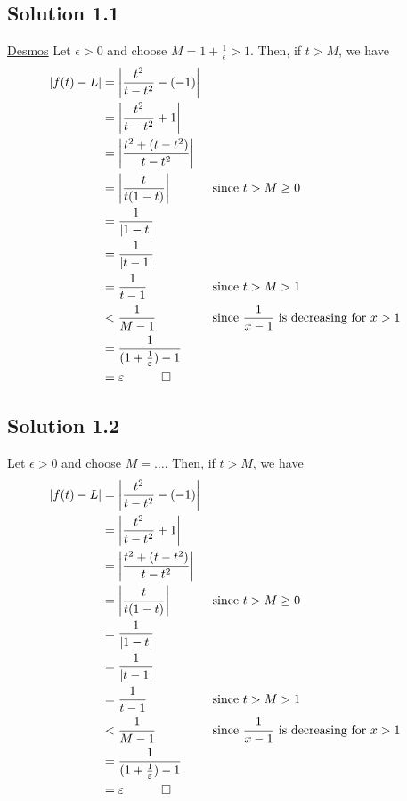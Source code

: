 \documentclass{article}
\begin{document}
\subsection*{Solution 1.1}
\href{https://www.desmos.com/calculator/xb5irgigpt}{Desmos}
Let $\epsilon > 0$ and choose $M = 1+\frac{1}{\epsilon} > 1$. Then, if $t > M$, we have
\begin{align*}
    \left| f(t) - L \right|     
    &= \left| \frac{t^2}{t-t^2} - (-1) \right| \\
    &= \left| \frac{t^2}{t-t^2} + 1 \right| \\
    &= \left| \frac{t^2+(t-t^2)}{t-t^2} \right| \\
    &= \left| \frac{t}{t(1-t)} \right| && \text{since }t > M \geq 0 \\
    &= \frac{1}{\left|1-t\right|} \\
    &= \frac{1}{\left|t-1\right|} \\
    &= \frac{1}{t-1} && \text{since } t >M > 1 \\
    &< \frac{1}{M-1} && \text{since } \frac{1}{x-1} \text{ is decreasing for } x > 1 \\
    &= \frac{1}{(1+\frac{1}{\epsilon})-1} \\
    &= \epsilon \quad \qed
\end{align*}
\subsection*{Solution 1.2}
Let $\epsilon > 0$ and choose $M = \ldots$. Then, if $t > M$, we have
\begin{align*}
    \left| f(t) - L \right|     
    &= \left| \frac{t^2}{t-t^2} - (-1) \right| \\
    &= \left| \frac{t^2}{t-t^2} + 1 \right| \\
    &= \left| \frac{t^2+(t-t^2)}{t-t^2} \right| \\
    &= \left| \frac{t}{t(1-t)} \right| && \text{since }t > M \geq 0 \\
    &= \frac{1}{\left|1-t\right|} \\
    &= \frac{1}{\left|t-1\right|} \\
    &= \frac{1}{t-1} && \text{since } t >M > 1 \\
    &< \frac{1}{M-1} && \text{since } \frac{1}{x-1} \text{ is decreasing for } x > 1 \\
    &= \frac{1}{(1+\frac{1}{\epsilon})-1} \\
    &= \epsilon \quad \qed
\end{align*}
\end{document}
